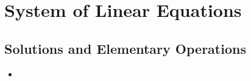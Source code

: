 \chapter{System of Linear Equations}\label{System of Linear Equations}
\section{Solutions and Elementary Operations}\label{Solutions and Elementary Operations}
\begin{itemize}
    \item 
\end{itemize}
